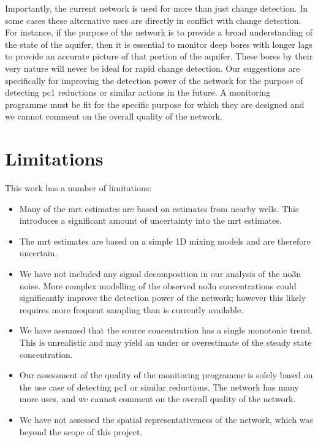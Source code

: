 Importantly, the current network is used for more than just change detection.
In some cases these alternative uses are directly in conflict with change detection.
For instance, if the purpose of the network is to provide a broad understanding of the state of the aquifer, then it is essential to monitor deep bores with longer lags to provide an accurate picture of that portion of the aquifer.
These bores by their very nature will never be ideal for rapid change detection.
Our suggestions are specifically for improving the detection power of the network for the purpose of detecting \gls{pc1} reductions or similar actions in the future.
A monitoring programme must be fit for the specific purpose for which they are designed and we cannot comment on the overall quality of the network.

\section[Limitations]{Limitations}

This work has a number of limitations:
\begin{itemize}
    \item Many of the \gls{mrt} estimates are based on estimates from nearby wells. This introduces a significant amount of uncertainty into the \gls{mrt} estimates.
    \item The \gls{mrt} estimates are based on a simple 1D mixing models and are therefore uncertain.
    \item We have not included any signal decomposition in our analysis of the \gls{no3n} noise. More complex modelling of the observed \gls{no3n} concentrations could significantly improve the detection power of the network; however this likely requires more frequent sampling than is currently available.
    \item We have assumed that the source concentration has a single monotonic trend. This is unrealistic and may yield an under or overestimate of the steady state concentration.
    \item Our assessment of the quality of the monitoring programme is solely based on the use case of detecting \gls{pc1} or similar reductions. The network has many more uses, and we cannot comment on the overall quality of the network.
    \item We have not assessed the spatial representativeness of the network, which was beyond the scope of this project.
\end{itemize}
